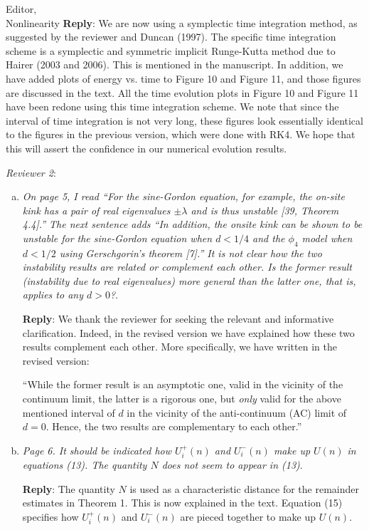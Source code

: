 \documentclass[11pt]{letter}
\begin{document}
\begin{letter}{Editor, \\
Nonlinearity}
{\bf Reply}: We are now using a symplectic time integration method, as suggested by the reviewer and Duncan (1997). The specific time integration scheme is a symplectic and symmetric implicit Runge-Kutta method due to Hairer (2003 and 2006). This is mentioned in the manuscript. In addition, we have added plots of energy vs. time to Figure 10 and Figure 11, and those figures are discussed in the text. All the time evolution plots in Figure 10 and Figure 11 have been redone using this time integration scheme. We note that since the interval of time integration is not very long, these figures look essentially identical to the figures in the previous version, which were done with RK4. We hope that this will assert the 
confidence in our numerical evolution results. 

{\it Reviewer 2}:
\begin{enumerate}[(a)]
\item \emph{On page 5, I read ``For the sine-Gordon equation, for example, the on-site kink has a pair of real eigenvalues $\pm \lambda$ and is thus unstable [39, Theorem 4.4].'' The next sentence adds ``In addition, the onsite kink can be shown to be unstable for the sine-Gordon equation when $d < 1/4$ and the $\phi_4$ model when $d < 1/2$ using Gerschgorin’s theorem [7].'' It is not clear how the two instability results are related or complement each other. Is the former result (instability due to real eigenvalues) more general than the latter one, that is, applies to any $d > 0$?}. 

{\bf Reply}: We thank the reviewer for seeking the relevant
and informative clarification. Indeed, in the revised version
we have explained how these two results complement each other.
More specifically, we have written in the revised version:

``While the former result is an asymptotic one, valid
in the vicinity of the continuum limit, the latter is a
rigorous one, but {\it only} valid for the above mentioned
interval of $d$ in the vicinity of the anti-continuum (AC) limit
of $d=0$. Hence, the two results are complementary to each other.''


\item \emph{Page 6. It should be indicated how $U_i^+(n)$ and $U_i^-(n)$ make up $U(n)$ in equations (13). The quantity $N$ does not seem to appear in (13)}. 


{\bf Reply}: The quantity $N$ is used as a characteristic distance for the remainder estimates in Theorem 1. This is now explained in the text. Equation (15) specifies how $U_i^+(n)$ and $U_i^-(n)$ are pieced together to make up $U(n)$.


\end{enumerate}
\end{letter}
\end{document}
